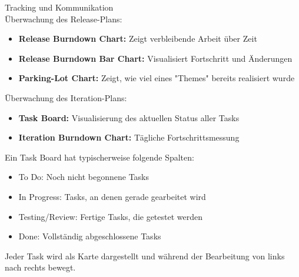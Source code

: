 \begin{concept}{Tracking und Kommunikation}\\
    Überwachung des Release-Plans:
    \begin{itemize}
        \item \textbf{Release Burndown Chart:} Zeigt verbleibende Arbeit über Zeit
        \item \textbf{Release Burndown Bar Chart:} Visualisiert Fortschritt und Änderungen
        \item \textbf{Parking-Lot Chart:} Zeigt, wie viel eines "Themes" bereits realisiert wurde
    \end{itemize}
    
    Überwachung des Iteration-Plans:
    \begin{itemize}
        \item \textbf{Task Board:} Visualisierung des aktuellen Status aller Tasks
        \item \textbf{Iteration Burndown Chart:} Tägliche Fortschrittsmessung
    \end{itemize}
\end{concept}

\begin{example}
    Ein Task Board hat typischerweise folgende Spalten:
    \begin{itemize}
        \item To Do: Noch nicht begonnene Tasks
        \item In Progress: Tasks, an denen gerade gearbeitet wird
        \item Testing/Review: Fertige Tasks, die getestet werden
        \item Done: Vollständig abgeschlossene Tasks
    \end{itemize}
    Jeder Task wird als Karte dargestellt und während der Bearbeitung von links nach rechts bewegt.
\end{example}